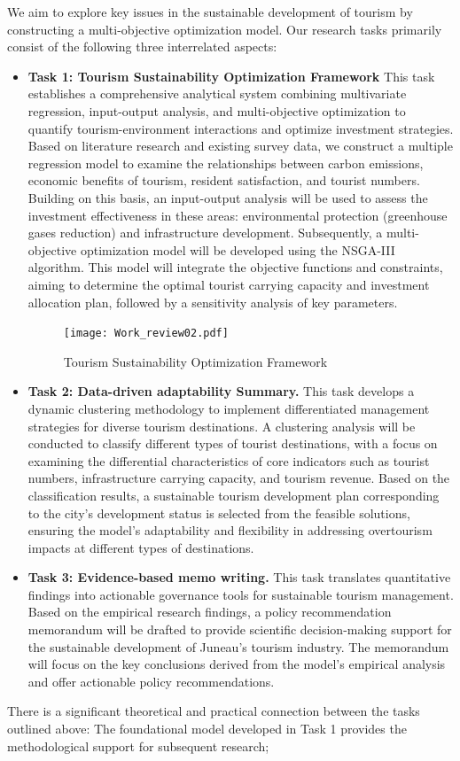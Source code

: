 \documentclass{mcmthesis}
\begin{document}
  We aim to explore key issues in the sustainable development of tourism by constructing a 
  multi-objective optimization model. Our research tasks primarily consist of the following three 
  interrelated aspects:
\begin{itemize}
  \item \textbf{Task 1:  Tourism Sustainability Optimization Framework} This task establishes a comprehensive analytical system combining multivariate regression, input-output analysis, and multi-objective optimization to quantify tourism-environment interactions and optimize investment strategies. Based on literature research and existing survey data, we construct a multiple regression model to examine the relationships between carbon emissions, economic benefits of tourism, resident satisfaction, and tourist numbers. Building on this basis, an input-output analysis will be used to assess the investment effectiveness in these areas: environmental protection (greenhouse gases reduction) and infrastructure development. Subsequently, a multi-objective optimization model will be developed using the NSGA-III algorithm. This model will integrate the objective functions and constraints, aiming to determine the optimal tourist carrying capacity and investment allocation plan, followed by a sensitivity analysis of key parameters.
  \begin{figure}[h!] 
    \centering
    \texttt{[image: Work\_review02.pdf]}
    \caption{Tourism Sustainability Optimization Framework} \label{fig2}
  \end{figure}
  \item \textbf{Task 2: Data-driven adaptability Summary.} This task develops a dynamic clustering methodology to implement differentiated management strategies for diverse tourism destinations. A clustering analysis will be conducted to classify different types of tourist destinations, with a focus on examining the differential characteristics of core indicators such as tourist numbers, infrastructure carrying capacity, and tourism revenue. 
  Based on the classification results, a sustainable tourism development plan corresponding to the city's development status is selected from the feasible solutions, ensuring the model's adaptability and flexibility in addressing overtourism impacts at different types of destinations.
  \item \textbf{Task 3: Evidence-based memo writing.} This task translates quantitative findings into actionable governance tools for sustainable tourism management. Based on the empirical research findings, a policy recommendation memorandum will be drafted to provide scientific decision-making support for the sustainable development of Juneau's tourism industry. The memorandum will focus on the key conclusions derived from the model's empirical analysis and offer actionable policy recommendations.
  \end{itemize}
  There is a significant theoretical and practical connection between the tasks outlined above: The foundational model developed in Task 1 provides the methodological support for subsequent research; 
\end{document}

